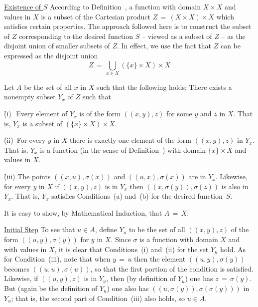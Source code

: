 {\V

        \underline{Existence of $S$} According to Definition~, a function with domain $X{\times}X$ and values in $X$ is a subset of the
    Cartesian product $Z \,=\, (X{\times}X){\times}X$ which satisfies certain properties.
    The approach followed here is to construct the subset of $Z$ corresponding to the desired function $S$ -- viewed as a  subset of $Z$ --
    as the disjoint union of smaller subsets of $Z$. In effect, we use the fact that $Z$  can be expressed as the disjoint union
        \begin{displaymath}
        Z \,=\, {\bigcup}_{x{\in}X} \left(\{x\}{\times}X\right){\times}X
        \end{displaymath}

        Let $A$ be the set of all $x$ in $X$ such that the following holds:
    There exists a nonempty subset $Y_{x}$ of $Z$ such that

        \h (i)\,\, Every element of $Y_{x}$ is of the form $((x,y),z)$ for some $y$ and $z$ in $X$.
    That is, $Y_{x}$ is a subset of $\left(\{x\}{\times}X\right){\times}X$.

        \h (ii)\, For every $y$ in $X$ there is exactly one element of the form $((x,y),z)$ in $Y_{x}$.
    That is, $Y_{x}$ is a function (in the sense of Definition~) with domain $\{x\}{\times}X$ and values in $X$.

        \h (iii) The points $((x,u),{\sigma}(x))$ and $((u,x),{\sigma}(x))$ are in $Y_{x}$.
    Likewise, for every $y$ in $X$ if $((x,y),z)$ is in $Y_{x}$ then $((x,{\sigma}(y)),{\sigma}(z))$ is also in $Y_{x}$.
    That is, $Y_{x}$ satisfies Conditions~(a) and~(b) for the desired function~$S$.

\noindent It is easy to show, by Mathematical Induction, that $A \,=\, X$:


        \underline{Initial Step} To see that $u{\in}A$, define $Y_{u}$ to be the set of all $((x,y),z)$ of the form $((u,y),{\sigma}(y))$ for $y$ in $X$.
    Since ${\sigma}$ is a function with domain $X$ and with values in $X$, it is clear that Conditions~(i) and~(ii) for the set $Y_{u}$ hold.
    As for Condition~(iii), note that when $y \,=\, u$ then the element $((u,y),{\sigma}(y))$ becomes $((u,u),{\sigma}(u))$, so that the first portion of the condition is satisfied.
    Likewise, if $((u,y),z)$ is in $Y_{u}$, then (by definition of $Y_{u}$) one has $z \,=\, {\sigma}(y)$.
    But (again be the definition of $Y_{u}$) one also has $((u,{\sigma}(y)),{\sigma}({\sigma}(y)))$ in $Y_{u}$;
    that is, the second part of Condition~(iii) also holds, so $u{\in}A$.

}
